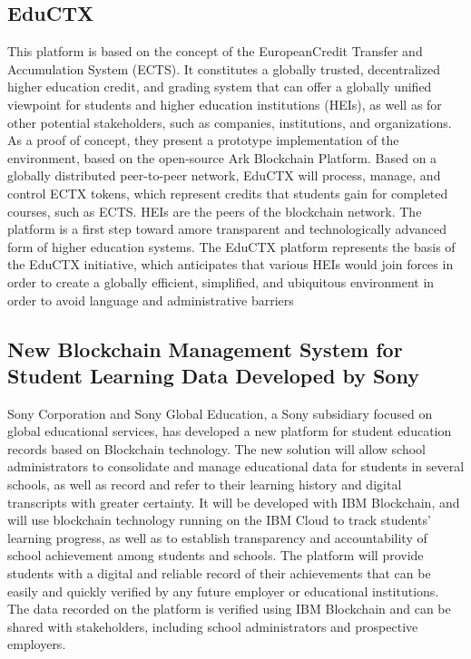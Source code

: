 \documentclass[conference]{IEEEtran}
\begin{document}
\subsection{EduCTX}
This platform is based on the concept of the EuropeanCredit Transfer and Accumulation System (ECTS). It constitutes a globally trusted, decentralized higher education credit, and grading system that can offer a globally unified viewpoint for students and higher education institutions (HEIs), as well as for other potential stakeholders, such as companies, institutions, and organizations. As a proof of concept, they present a prototype implementation of the environment, based on the open-source Ark Blockchain Platform. Based on a globally distributed peer-to-peer network, EduCTX will process, manage, and control ECTX tokens, which represent credits that students gain for completed courses, such as ECTS. HEIs are the peers of the blockchain network. The platform is a first step toward amore transparent and technologically advanced form of higher education systems. The EduCTX platform represents the basis of the EduCTX initiative, which anticipates that various HEIs would join forces in order to create a globally efficient, simplified, and ubiquitous environment in order to avoid language and administrative barriers

\subsection{New Blockchain Management System for Student Learning Data Developed by Sony}
Sony Corporation and Sony Global Education, a Sony subsidiary focused on global educational services, has developed a new platform for student education records based on Blockchain technology. The new solution will allow school administrators to consolidate and manage educational data for students in several schools, as well as record and refer to their learning history and digital transcripts with greater certainty. It will be developed with IBM Blockchain, and will use blockchain technology running on the IBM Cloud to track students’ learning progress, as well as to establish transparency and accountability of school achievement among students and schools. The platform will provide students with a digital and reliable record of their achievements that can be easily and quickly verified by any future employer or educational institutions. The data recorded on the platform is verified using IBM Blockchain and can be shared with stakeholders, including school administrators and prospective employers.
\end{document}
